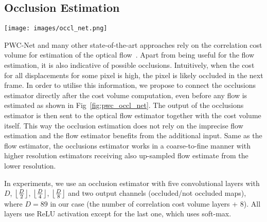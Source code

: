 \documentclass[runningheads]{llncs}
\DeclarePairedDelimiter{\floor}{\lfloor}{\rfloor}
\begin{document}
\subsection{Occlusion Estimation}
\begin{figure*}[t]
\centering
\texttt{[image: images/occl\_net.png]}
\vspace*{1ex}
\caption{ContinualFlow - optical flow and occlusion decoder, which extends
the PWC-Net~\cite{Sun2017} flow decoder for occlusion estimation.
The feature pyramid extractor (in blue) is a convolutional network which produces a feature pyramid given an input image.
A correlation cost volume is computed on each scale from warped features from the second frame using up-sampled flow estimated at a coarser level of decoder.
The cost volume is used to estimate occlusions in occlusion estimator (in magenta). The cost volume and the occlusion map are inputs to the optical flow estimator.
For clarity, the diagram shows only three of the six levels of the ContinualFlow pyramid extractor. The output resolution is quarter of the input reference frame. Please, refer to the text for additional network details and inputs explanation.\vspace*{-1ex}}
\label{fig:pwc_occl_net}
\end{figure*}

PWC-Net and many other state-of-the-art approaches rely on the correlation cost volume for estimation of the optical flow~\cite{Dosovitskiy2015,Ilg2016,Ranjan2016,Sun2017,Meister2017}. Apart from being useful for the flow estimation, it is also indicative of possible occlusions.
Intuitively, when the cost for all displacements for some pixel is high, the pixel is likely occluded in the next frame.
In order to utilise this information, we propose to connect the occlusions estimator directly after the cost volume computation, even before any flow is estimated as shown in Fig~\ref{fig:pwc_occl_net}.
The output of the occlusions estimator is then sent to the optical flow estimator together with the cost volume itself.
This way the occlusion estimation does not rely on the imprecise flow estimation and the flow estimator benefits from the additional input.
Same as the flow estimator, the occlusions estimator works in a coarse-to-fine manner with higher resolution estimators receiving also up-sampled flow estimate from the lower resolution.

In experiments, we use an occlusion estimator with five convolutional layers with $D$, $\floor[\big]{\frac{D}{2}}$, $\floor[\big]{\frac{D}{4}}$, $\floor[\big]{\frac{D}{8}}$ and two output channels (occluded/not occluded maps), where $D=89$ in our case (the number of correlation cost volume layers + 8).
All layers use ReLU activation except for the last one, which uses soft-max.
\end{document}
